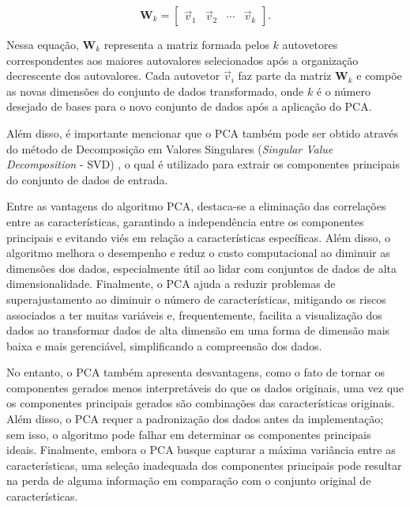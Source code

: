 \begin{enumerate}
    \begin{equation}
        \label{deep:eq:pca_5}
        \boldsymbol{W}_k = \begin{bmatrix} \overrightarrow{v}_1 & \overrightarrow{v}_2 & \cdots & \overrightarrow{v}_k \end{bmatrix}.
    \end{equation}

    Nessa equação, $\boldsymbol{W}_k$ representa a matriz formada pelos $k$ autovetores correspondentes aos maiores autovalores selecionados após a organização decrescente dos autovalores. Cada autovetor $\overrightarrow{v}_i$ faz parte da matriz $\boldsymbol{W}_k$ e compõe as novas dimensões do conjunto de dados transformado, onde $k$ é o número desejado de bases para o novo conjunto de dados após a aplicação do PCA.

    
\end{enumerate}

Além disso, é importante mencionar que o PCA também pode ser obtido através do método de Decomposição em Valores Singulares (\textit{Singular Value Decomposition} - SVD) \citep{Stewart2006OnDecomposition}, o qual é utilizado para extrair os componentes principais do conjunto de dados de entrada.

Entre as vantagens do algoritmo PCA, destaca-se a eliminação das correlações entre as características, garantindo a independência entre os componentes principais e evitando viés em relação a características específicas. Além disso, o algoritmo melhora o desempenho e reduz o custo computacional ao diminuir as dimensões dos dados, especialmente útil ao lidar com conjuntos de dados de alta dimensionalidade. Finalmente, o PCA ajuda a reduzir problemas de superajustamento ao diminuir o número de características, mitigando os riscos associados a ter muitas variáveis e, frequentemente, facilita a visualização dos dados ao transformar dados de alta dimensão em uma forma de dimensão mais baixa e mais gerenciável, simplificando a compreensão dos dados.

No entanto, o PCA também apresenta desvantagens, como o fato de tornar os componentes gerados menos interpretáveis do que os dados originais, uma vez que os componentes principais gerados são combinações das características originais. Além disso, o PCA requer a padronização dos dados antes da implementação; sem isso, o algoritmo pode falhar em determinar os componentes principais ideais. Finalmente, embora o PCA busque capturar a máxima variância entre as características, uma seleção inadequada dos componentes principais pode resultar na perda de alguma informação em comparação com o conjunto original de características.

